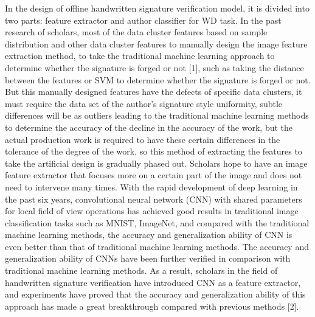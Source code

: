 In the design of offline handwritten signature verification model, it is divided into two parts: feature extractor and author classifier for WD task. In the past research of scholars, most of the data cluster features based on sample distribution and other data cluster features to manually design the image feature extraction method, to take the traditional machine learning approach to determine whether the signature is forged or not [1], such as taking the distance between the features or SVM to determine whether the signature is forged or not. But this manually designed features have the defects of specific data clusters, it must require the data set of the author's signature style uniformity, subtle differences will be as outliers leading to the traditional machine learning methods to determine the accuracy of the decline in the accuracy of the work, but the actual production work is required to have these certain differences in the tolerance of the degree of the work, so this method of extracting the features to take the artificial design is gradually phased out. Scholars hope to have an image feature extractor that focuses more on a certain part of the image and does not need to intervene many times. With the rapid development of deep learning in the past six years, convolutional neural network (CNN) with shared parameters for local field of view operations has achieved good results in traditional image classification tasks such as MNIST, ImageNet, and compared with the traditional machine learning methods, the accuracy and generalization ability of CNN is even better than that of traditional machine learning methods. The accuracy and generalization ability of CNNs have been further verified in comparison with traditional machine learning methods. As a result, scholars in the field of handwritten signature verification have introduced CNN as a feature extractor, and experiments have proved that the accuracy and generalization ability of this approach has made a great breakthrough compared with previous methods [2].

